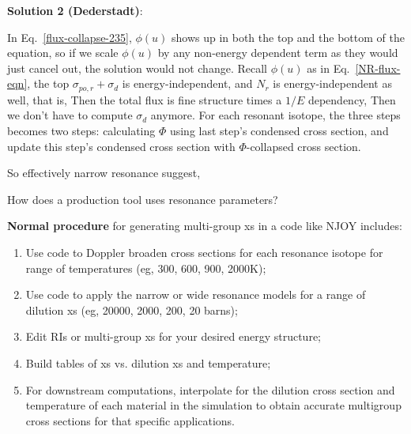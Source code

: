 \documentclass{school-22.211-notes}
\begin{document}
\begin{enumerate}
\textbf{Solution 2 (Dederstadt)}: 

In Eq.~\ref{flux-collapse-235}, $\phi(u)$ shows up in both the top and the bottom of the equation, so if we scale $\phi(u)$ by any non-energy dependent term as they would just cancel out, the solution would not change. Recall $\phi(u)$ as in Eq.~\ref{NR-flux-eqn}, the top $\sigma_{po,r} + \sigma_d$ is energy-independent, and $N_r$ is energy-independent as well, that is, 
Then the total flux is fine structure times a $1/E$ dependency, 
Then we don't have to compute $\sigma_d$ anymore. For each resonant isotope, the three steps becomes two steps: calculating $\Phi$ using last step's condensed cross section, and update this step's condensed cross section with $\Phi$-collapsed cross section. 

So effectively narrow resonance suggest, 

\end{enumerate}




How does a production tool uses resonance parameters?

\textbf{Normal procedure} for generating multi-group xs in a code like NJOY includes:
\begin{enumerate}
\item Use code to Doppler broaden cross sections for each resonance isotope for range of temperatures (eg, 300, 600, 900, 2000K); 
\item Use code to apply the narrow or wide resonance models for a range of dilution xs (eg, 20000, 2000, 200, 20 barns); 
\item Edit RIs or multi-group xs for your desired energy structure; 
\item Build tables of xs vs. dilution xs and temperature;
\item For downstream computations, interpolate for the dilution cross section and temperature of each material in the simulation to obtain accurate multigroup cross sections for that specific applications. 
\end{enumerate}
\end{document}
